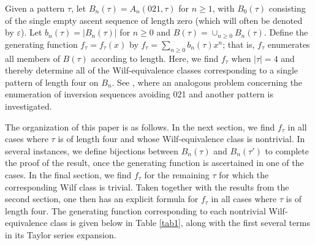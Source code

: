 \documentclass{article}
\theoremstyle{remark}
\theoremstyle{plain}
\begin{document}
Given a pattern $\tau$, let $B_n(\tau)=A_n(021,\tau)$ for $n \geq 1$, with $B_0(\tau)$ consisting of the single empty ascent sequence of length zero (which will often be denoted by $\varepsilon$).  Let $b_n(\tau)=|B_n(\tau)|$ for $n\geq0$ and $B(\tau)=\cup_{n\geq0}B_n(\tau)$.  Define the generating function $f_\tau=f_\tau(x)$ by $f_\tau=\sum_{n\geq0}b_n(\tau)x^n$; that is, $f_\tau$ enumerates all members of $B(\tau)$ according to length.  Here, we find $f_\tau$ when $|\tau|=4$ and thereby determine all of the Wilf-equivalence classes corresponding to a single pattern of length four on $B_n$.  See \cite{MY}, where an analogous problem concerning the enumeration of inversion sequences avoiding 021 and another pattern is investigated.

The organization of this paper is as follows. In the next section, we find $f_\tau$ in all cases where $\tau$ is of length four and whose Wilf-equivalence class is nontrivial.  In several instances, we define bijections between $B_n(\tau)$ and $B_n(\tau')$ to complete the proof of the result, once the generating function is ascertained in one of the cases.  In the final section, we find $f_\tau$ for the remaining $\tau$ for which the corresponding Wilf class is trivial.  Taken together with the results from the second section, one then has an explicit formula for $f_\tau$ in all cases where $\tau$ is of length four.  The generating function corresponding to each nontrivial Wilf-equivalence class is given below in Table \ref{tab1}, along with the first several terms in its Taylor series expansion.
\end{document}
